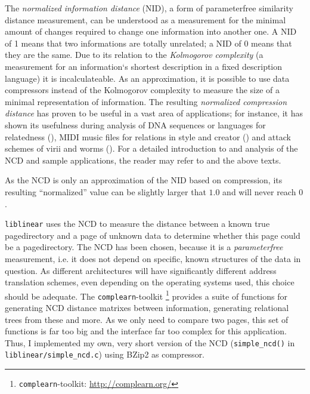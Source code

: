 \label{ATTstatistics} The \emph{normalized information distance} (NID), a form
of parameterfree similarity distance measurement, can be understood as a
measurement for the minimal amount of changes required to change one information
into another one.  A NID of 1 means that two informations are totally unrelated;
a NID of 0 means that they are the same.  Due to its relation to the
\emph{Kolmogorov complexity} (a measurement for an information`s shortest
description in a fixed description language) it is incalculateable.  As an
approximation, it is possible to use data compressors instead of the Kolmogorov
complexity to measure the size of a minimal representation of information. The
resulting \emph{normalized compression distance} has proven to be useful in a
vast area of applications; for instance, it has shown its usefulness during
analysis of DNA sequences or languages for relatedness
(\cite{clustering_by_compression:2005,similarity_matrix:2004}), MIDI music files
for relations in style and creator (\cite{clustering_by_compression:2005}) and
attack schemes of virii and worms (\cite{analysing_worms_with_ncd:2006}).  For a
detailed introduction to and analysis of the NCD and sample applications, the
reader may refer to \cite{kolmogorov:1997} and the above texts.

As the NCD is only an approximation of the NID based on compression, its
resulting ``normalized'' value can be slightly larger that $1.0$ and will never
reach $0$.

\texttt{liblinear} uses the NCD to measure the distance between a known true
pagedirectory and a page of unknown data to determine whether this page could be
a pagedirectory. The NCD has been chosen, because it is a \emph{parameterfree}
measurement, i.e. it does not depend on specific, known structures of the data
in question. As different architectures will have significantly different
address translation schemes, even depending on the operating systems used, this
choice should be adequate. The \texttt{complearn}-toolkit
\footnote{\texttt{complearn}-toolkit:
\href{http://complearn.org/}{http://complearn.org/}} provides a suite of
functions for generating NCD distance matrixes between information, generating
relational trees from these and more.  As we only need to compare two pages,
this set of functions is far too big and the interface far too complex for this
application.  Thus, I implemented my own, very short version of the NCD
(\texttt{simple\_ncd()} in \texttt{liblinear/simple\_ncd.c}) using BZip2 as
compressor.


